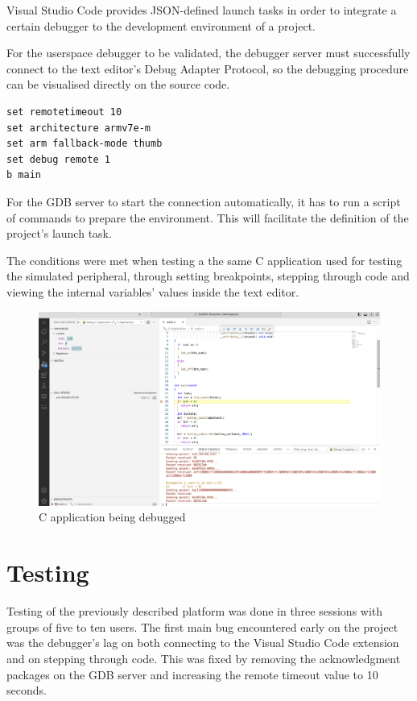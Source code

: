 \documentclass[12pt,a4paper]{report}
\begin{document}
Visual Studio Code provides JSON-defined launch tasks in order to integrate a certain debugger to the development environment of a project.

For the userspace debugger to be validated, the debugger server must successfully connect to the text editor's Debug Adapter Protocol, so the debugging procedure can be visualised directly on the source code.

\begin{lstlisting}[language=GDB]
set remotetimeout 10
set architecture armv7e-m
set arm fallback-mode thumb
set debug remote 1
b main
\end{lstlisting}

For the GDB server to start the connection automatically, it has to run a script of commands to prepare the environment. This will facilitate the definition of the project's launch task.

The conditions were met when testing a the same C application used for testing the simulated peripheral, through setting breakpoints, stepping through code and viewing the internal variables' values inside the text editor.

\begin{figure}[H]
\centering
\includegraphics[scale=0.30]{pics/vscode_debug.png}
  \caption[C application being debugged]{C application being debugged}
  \label{fig:platform}
\end{figure}

\section{Testing}

Testing of the previously described platform was done in three sessions with groups of five to ten users. The first main bug encountered early on the project was the debugger's lag on both connecting to the Visual Studio Code extension and on stepping through code. This was fixed by removing the acknowledgment packages on the GDB server and increasing the remote timeout value to 10 seconds.
\end{document}
